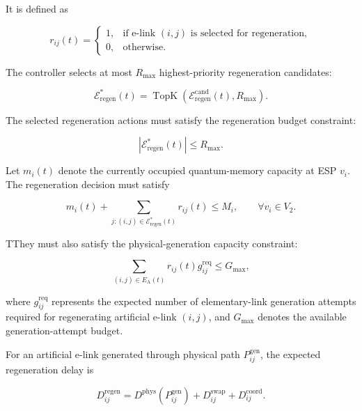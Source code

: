It is defined as

\begin{equation}
    r_{ij}(t)
    =
    \begin{cases}
        1, & \text{if e-link $(i,j)$ is selected for regeneration},\\
        0, & \text{otherwise}.
    \end{cases}
\end{equation}

The controller selects at most $R_{\max}$ highest-priority regeneration candidates:

\begin{equation}
    \mathcal{E}_{\mathrm{regen}}^{*}(t)
    =
    \operatorname{TopK}
    \left(
    \mathcal{E}_{\mathrm{regen}}^{\mathrm{cand}}(t),
    R_{\max}
    \right).
\end{equation}

The selected regeneration actions must satisfy the regeneration budget constraint:

\begin{equation}
    |
    \mathcal{E}_{\mathrm{regen}}^{*}(t)
    |
    \leq
    R_{\max}.
\end{equation}

Let $m_i(t)$ denote the currently occupied quantum-memory capacity at ESP $v_i$. The regeneration decision must satisfy

\begin{equation}
    m_i(t)
    +
    \sum_{
    j:
    (i,j)
    \in
    \mathcal{E}_{\mathrm{regen}}^{*}(t)
    }
    r_{ij}(t)
    \leq
    M_i,
    \qquad
    \forall v_i
    \in
    V_2.
\end{equation}

TThey must also satisfy the physical-generation capacity constraint:

\begin{equation}
    \sum_{
    (i,j)
    \in
    E_{\mathrm{A}}(t)
    }
    r_{ij}(t)
    g_{ij}^{\mathrm{req}}
    \leq
    G_{\max},
\end{equation}

where $g_{ij}^{\mathrm{req}}$ represents the expected number of elementary-link generation attempts required for regenerating artificial e-link $(i,j)$, and $G_{\max}$ denotes the available generation-attempt budget.

For an artificial e-link generated through physical path $P_{ij}^{\mathrm{gen}}$, the expected regeneration delay is

\begin{equation}
    D_{ij}^{\mathrm{regen}}
    =
    D^{\mathrm{phys}}
    \left(
    P_{ij}^{\mathrm{gen}}
    \right)
    +
    D_{ij}^{\mathrm{swap}}
    +
    D_{ij}^{\mathrm{coord}}.
\end{equation}

